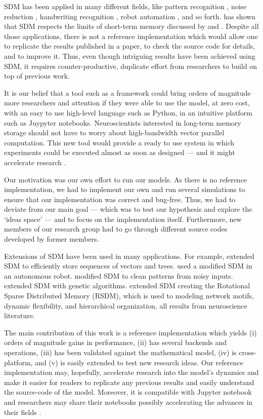 SDM has been applied in many different fields, like pattern recognition \citep{norman2003modeling, rao1995natural}, noise reduction \citep{Meng2009}, handwriting recognition \citep{fan1997genetic}, robot automation \citep{Rajesh1998, mendes2008robot}, and so forth. \citet{Linhares2011} has shown that SDM respects the limits of short-term memory discussed by \citet{Miller1955} and \citet{Cowan2011}. Despite all those applications, there is not a reference implementation which would allow one to replicate the results published in a paper, to check the source code for details, and to improve it. Thus, even though intriguing results have been achieved using SDM, it requires counter-productive, duplicate effort from researchers to build on top of previous work.

It is our belief that a tool such as a framework could bring orders of magnitude more researchers and attention if they were able to use the model, at zero cost, with an easy to use high-level language such as Python, in an intuitive platform such as Juypyter notebooks. Neuroscientists interested in long-term memory storage should not have to worry about high-bandwidth vector parallel computation.  This new tool would provide a ready to use system in which experiments could be executed almost as soon as designed --- and it might accelerate research \citep{shen2014interactive}.

Our motivation was our own effort to run our models. As there is no reference implementation, we had to implement our own and run several simulations to ensure that our implementation was correct and bug-free. Thus, we had to deviate from our main goal --- which was to test our hypothesis and explore the `ideas space' --- and to focus on the implementation itself. Furthermore, new members of our research group had to go through different source codes developed by former members.

Extensions of SDM have been used in many applications. For example, \citet{Snaider2011} extended SDM to efficiently store sequences of vectors and trees.  \citet{Rajesh1998} used a modified SDM in an autonomous robot. \citet{Meng2009} modified SDM to clean patterns from noisy inputs. \citet{fan1997genetic} extended SDM with genetic algorithms. \citet{chada2016you} extended SDM creating the Rotational Sparse Distributed Memory (RSDM), which is used to modeling network motifs, dynamic flexibility, and hierarchical organization, all results from neuroscience literature.

The main contribution of this work is a reference implementation which yields (i) orders of magnitude gains in performance, (ii) has several backends and operations, (iii) has been validated against the mathematical model, (iv) is cross-platform, and (v) is easily extended to test new research ideas. Our reference implementation may, hopefully, accelerate research into the model's dynamics and make it easier for readers to replicate any previous results and easily understand the source-code of the model.  Moreover, it is compatible with Jupyter notebook and researchers may share their notebooks possibly accelerating the advances in their fields \citep{shen2014interactive}.

